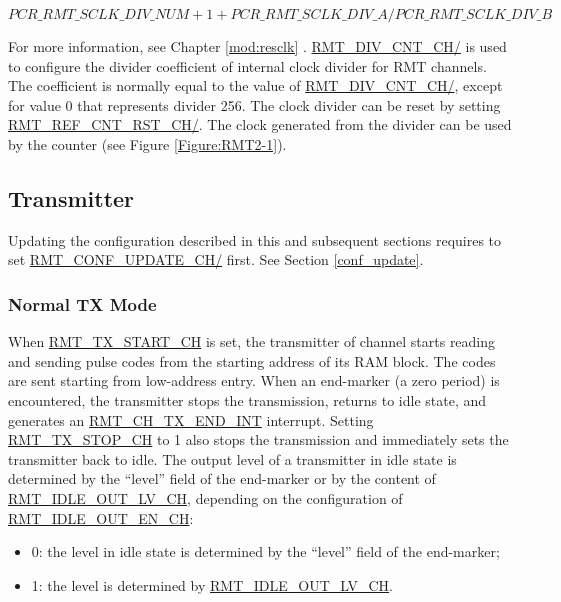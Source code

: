 \documentclass[main\_\_EN.tex]{subfiles}
\begin{document}
$$
PCR\_RMT\_SCLK\_DIV\_NUM + 1 + PCR\_RMT\_SCLK\_DIV\_A/PCR\_RMT\_SCLK\_DIV\_B
$$

For more information, see Chapter \ref{mod:resclk} \textit{}. \hyperref[fielddesc:RMTDIVCNTCHN]{RMT\_DIV\_CNT\_CH/} is used to configure the divider coefficient of internal clock divider for RMT channels. The coefficient is normally equal to the value of \hyperref[fielddesc:RMTDIVCNTCHN]{RMT\_DIV\_CNT\_CH/}, except for value 0 that represents divider 256. The clock divider can be reset by setting \hyperref[fielddesc:RMTREFCNTRSTCHN]{RMT\_REF\_CNT\_RST\_CH/}. The clock generated from the divider can be used by the counter (see Figure \ref{Figure:RMT2-1}).

\subsection{Transmitter}
\vspace{0.4cm}

\begin{tiplisting}
Updating the configuration described in this and subsequent sections requires to set \hyperref[fielddesc:RMTCONFUPDATECHN]{RMT\_CONF\_UPDATE\_CH/} first. See Section \ref{conf_update}.
\end{tiplisting}

\subsubsection{Normal TX Mode}\label{sec:normal-tx-mode}

When \hyperref[fielddesc:RMTTXSTARTCHN]{RMT\_TX\_START\_CH} is set, the transmitter of channel  starts reading and sending pulse codes from the starting address of its RAM block. The codes are sent starting from low-address entry. 
When an end-marker (a zero period) is encountered, the transmitter stops the transmission, returns to idle state, and generates an  \hyperref[int:RMTCHnTXENDINT]{RMT\_CH\_TX\_END\_INT} interrupt. Setting \hyperref[fielddesc:RMTTXSTOPCHN]{RMT\_TX\_STOP\_CH} to 1 also stops the transmission and immediately sets the transmitter back to idle. 
The output level of a transmitter in idle state is determined by the ``level” field of the end-marker or by the content of  \hyperref[fielddesc:RMTIDLEOUTLVCHN]{RMT\_IDLE\_OUT\_LV\_CH}, depending on the configuration of \hyperref[fielddesc:RMTIDLEOUTENCHN]{RMT\_IDLE\_OUT\_EN\_CH}:
\begin{itemize}
    \item 0: the level in idle state is determined by the “level” field of the end-marker;
    \item 1: the level is determined by \hyperref[fielddesc:RMTIDLEOUTLVCHN]{RMT\_IDLE\_OUT\_LV\_CH}.
\end{itemize}
\end{document}
